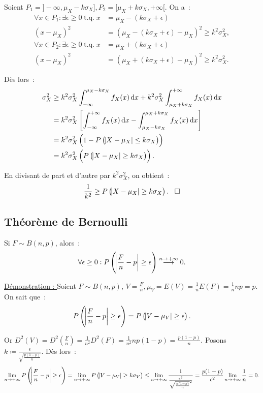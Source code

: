 \documentclass{article}
\DeclareMathOperator{\tq}{\text{ t.q. }}
\begin{document}
		Soient $P_1 = ]-\infty, \mu_X-k\sigma_X], P_2 = [\mu_X+k\sigma_X, +\infty[$. On a~:
		\begin{align*}
			\forall x \in P_1 : \exists \epsilon \geq 0 \tq x &= \mu_X - (k\sigma_X + \epsilon) \\
			                                      (x-\mu_X)^2 &= (\mu_X - (k\sigma_X+\epsilon) - \mu_X)^2 \geq k^2\sigma_X^2, \\
			\forall x \in P_2 : \exists \epsilon \geq 0 \tq x &= \mu_X + (k\sigma_X + \epsilon) \\
			                                      (x-\mu_X)^2 &= (\mu_X + (k\sigma_X+\epsilon) - \mu_X)^2 \geq k^2\sigma_X^2.
		\end{align*}

		Dès lors~:
		\begin{align*}
			\sigma_X^2 &\geq k^2\sigma_X^2\int_{-\infty}^{\mu_X-k\sigma_X}f_X(x)\dif x + k^2\sigma_X^2\int_{\mu_X+k\sigma_X}^{+\infty}f_X(x)\dif x \\
			&= k^2\sigma_X^2\left[ \int_{-\infty}^{+\infty}f_X(x)\dif x - \int_{\mu_X-k\sigma_X}^{\mu_X+k\sigma_X}f_X(x)\dif x \right] \\
			&= k^2\sigma_X^2\left(1-P\left(\abs{X-\mu_X} \leq k\sigma_X\right)\right) \\
			&= k^2\sigma_X^2\left(P\left(\abs{X-\mu_X} \geq k\sigma_X\right)\right).
		\end{align*}

		En divisant de part et d'autre par $k^2\sigma_X^2$, on obtient~:
		\[\frac 1{k^2} \geq P\left(\abs{X-\mu_X} \geq k\sigma_X\right).\;\;\;\square\]

	\subsection{Théorème de Bernoulli}
		Si $F \sim B(n, p)$, alors~:
		\[\forall \epsilon \geq 0 : P\left(\abs{\frac Fn - p} \geq \epsilon\right) \stackrel{n\to+\infty}{\longrightarrow}0.\]

		\underline{Démonstration : } Soient $F \sim B(n, p)$, $V = \frac Fn, \mu_V = E(V) = \frac 1nE(F) = \frac 1nnp = p$. On sait que~:
		\[P\left( \abs{\frac Fn-p} \geq \epsilon \right) = P\left( \abs{V-\mu_V} \geq \epsilon\right).\]

		Or $D^2(V) = D^2\left(\frac Fn\right) = \frac 1{n^2}D^2(F) = \frac 1{n^2}np(1-p) = \frac {p(1-p)}n$. Posons
		$k \coloneqq \frac \epsilon{\sqrt {\frac {p(1-p)}n}}$. Dès lors~:
		\[\lim_{n\to+\infty}P\left(\abs{\frac Fn - p} \geq \epsilon\right) = \lim_{n\to+\infty}P\left(\abs{V-\mu_V} \geq k\sigma_V\right)
			\leq \lim_{n\to+\infty}\frac 1{\frac {\epsilon^2}{\sqrt{\frac {p(1-p)}n}^2}} = \frac {p(1-p)}{\epsilon^2}\lim_{n\to+\infty}\frac 1n = 0.\]
\end{document}
